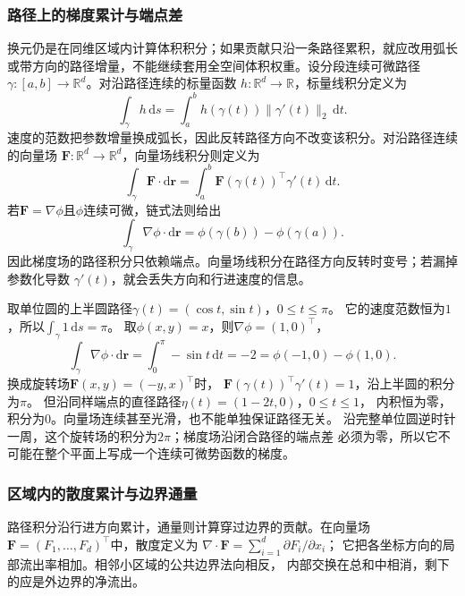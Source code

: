 \subsubsection{路径上的梯度累计与端点差}

换元仍是在同维区域内计算体积积分；如果贡献只沿一条路径累积，就应改用弧长或带方向的路径增量，不能继续套用全空间体积权重。设分段连续可微路径$\gamma:[a,b]\to\mathbb{R}^d$。对沿路径连续的标量函数
$h:\mathbb{R}^d\to\mathbb{R}$，标量线积分定义为
\[
  \int_\gamma h\,\mathrm{d}s
  =
  \int_a^b h(\gamma(t))\lVert\gamma'(t)\rVert_2\,\mathrm{d}t.
\]
速度的范数把参数增量换成弧长，因此反转路径方向不改变该积分。对沿路径连续的向量场
$\bm{F}:\mathbb{R}^d\to\mathbb{R}^d$，向量场线积分则定义为
\[   \int_{\gamma}\bm{F}\mathbin{\cdot}\mathrm{d}\bm{r}   =   \int_a^b   \bm{F}(\gamma(t))^{\top}\gamma'(t)\,\mathrm{d}t. \]
若$\bm{F}=\nabla\phi$且$\phi$连续可微，链式法则给出
\begin{equation}
  \int_{\gamma}\nabla\phi\mathbin{\cdot}\mathrm{d}\bm{r}
  =
  \phi(\gamma(b))-\phi(\gamma(a)).
\label{eq:analysis-line-integral-gradient}
\end{equation}
因此梯度场的路径积分只依赖端点。向量场线积分在路径方向反转时变号；若漏掉参数化导数
$\gamma'(t)$，就会丢失方向和行进速度的信息。

\begin{example}
\label{ex:analysis-path-integral-comparison}
取单位圆的上半圆路径$\gamma(t)=(\cos t,\sin t)$，$0\leq t\leq\pi$。
它的速度范数恒为$1$，所以$\int_\gamma1\,\mathrm ds=\pi$。
取$\phi(x,y)=x$，则$\nabla\phi=(1,0)^\top$，
\[
 \int_\gamma\nabla\phi\mathbin{\cdot}\mathrm d\bm r
 =\int_0^\pi-\sin t\,\mathrm dt=-2
 =\phi(-1,0)-\phi(1,0).
\]
换成旋转场$\bm F(x,y)=(-y,x)^\top$时，
$\bm F(\gamma(t))^\top\gamma'(t)=1$，沿上半圆的积分为$\pi$。
但沿同样端点的直径路径$\eta(t)=(1-2t,0)$，$0\leq t\leq1$，
内积恒为零，积分为$0$。向量场连续甚至光滑，也不能单独保证路径无关。
沿完整单位圆逆时针一周，这个旋转场的积分为$2\pi$；梯度场沿闭合路径的端点差
必须为零，所以它不可能在整个平面上写成一个连续可微势函数的梯度。
\end{example}

\subsubsection{区域内的散度累计与边界通量}
路径积分沿行进方向累计，通量则计算穿过边界的贡献。在向量场
$\bm F=(F_1,\ldots,F_d)^\top$中，散度定义为
$\nabla\mathbin{\cdot}\bm F=\sum_{i=1}^d\partial F_i/\partial x_i$；
它把各坐标方向的局部流出率相加。相邻小区域的公共边界法向相反，
内部交换在总和中相消，剩下的应是外边界的净流出。

